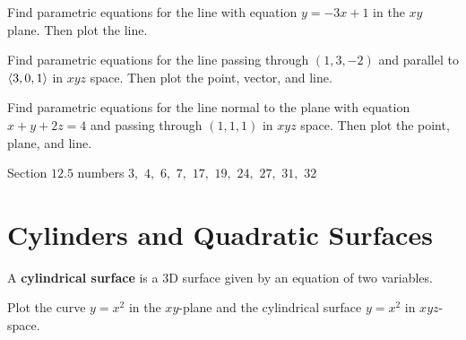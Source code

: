 \documentclass[letterpaper, twoside, 12pt]{book}
\begin{document}
          \begin{problem}
            Find parametric equations for the line with equation $y=-3x+1$
            in the $xy$ plane. Then plot the line.
          \end{problem}

          \begin{solution}

          \end{solution}

          \begin{problem}
            Find parametric equations for the line passing through $(1,3,-2)$
            and parallel to $\langle3,0,1\rangle$ in $xyz$ space. Then plot the point,
            vector, and line.
          \end{problem}

          \begin{solution}

          \end{solution}

          \begin{problem}
            Find parametric equations for the line normal to the plane with
            equation $x+y+2z=4$ and passing through $(1,1,1)$ in $xyz$ space.
            Then plot the point, plane, and line.
          \end{problem}



\begin{suggestedHW}
  Section $12.5$ numbers $3,$ $4,$ $6,$ $7,$ $17,$ $19,$ $24,$ $27,$ $31,$ $32$
\end{suggestedHW}




\section{Cylinders and Quadratic Surfaces}

\begin{definition}
  A \textbf{cylindrical surface} is a 3D surface given by an
  equation of two variables.
\end{definition}

          \begin{problem}
            Plot the curve $y=x^2$ in the $xy$-plane and the
            cylindrical surface $y=x^2$ in $xyz$-space.
          \end{problem}

          \begin{solution}

          \end{solution}
\end{document}
